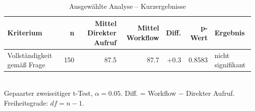 \begin{table}[htbp]
\centering
\caption{Ausgewählte Analyse -- Kurzergebnisse}
\begin{tabular}{lrrrrrl}
\toprule
Kriterium & n & Mittel Direkter Aufruf & Mittel Workflow & Diff. & p-Wert & Ergebnis \\
\midrule
Vollständigkeit gemäß Frage & 150 & 87.5 & 87.7 & +0.3 & 0.8583 & nicht signifikant \\
\bottomrule
\end{tabular}
\\[2mm]
\footnotesize Gepaarter zweiseitiger t-Test, $\alpha=0.05$. Diff. = Workflow $-$ Direkter Aufruf. Freiheitsgrade: $df=n-1$.
\end{table}
